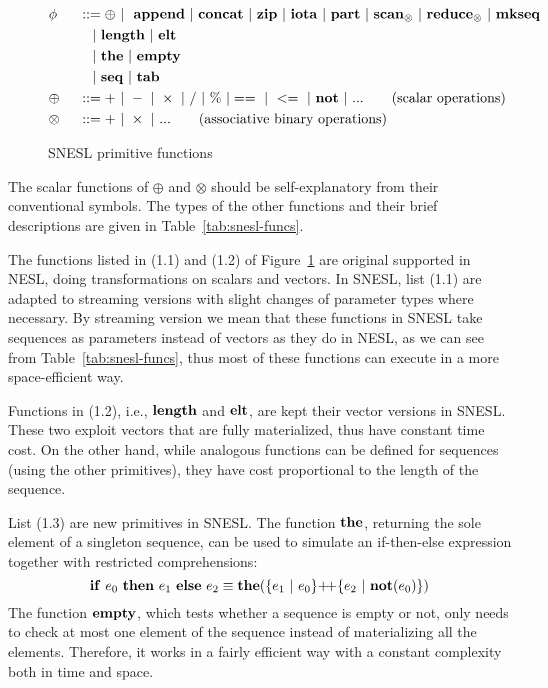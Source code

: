 \begin{figure}[H]\large
\begin{alignat}{2} 
&\phi && ::= \oplus \ | \ \ \mathbf{append} \ | \ \mathbf{concat} \ | \ \mathbf{zip} \ | \ \mathbf{iota}  \ | \ \mathbf{part}  \ | \ \mathbf{scan}_{\otimes} \ | \ \mathbf{reduce}_{\otimes} \ | \ \mathbf{mkseq} \\
&   && \quad | \ \mathbf{length} \ | \ \mathbf{elt} \\
&   && \quad | \ \mathbf{the}  \ | \ \mathbf{empty} \\
&   && \quad | \ \mathbf{seq} \ | \ \mathbf{tab} \\
& \oplus  \ && :: = + \ | \ - \ | \ \times \ |  \  / \ | \ \% \ | ==  \ |\ <=  \ | \ \mathbf{not} \ | \ ... \tag{scalar operations} \\
& \otimes \ && :: = + \ | \ \times  \ | \ ...  \tag{associative binary operations}
\end{alignat}
\caption{SNESL primitive functions \label{fig-snesl-func}}
\end{figure}

The scalar functions of $\oplus$ and $\otimes$ should be self-explanatory from their conventional symbols. 
The types of the other functions and their brief descriptions are given in Table~\ref{tab:snesl-funcs}.

The functions listed in (1.1) and (1.2) of Figure~\ref{fig-snesl-func} are original supported in NESL, doing transformations on scalars and vectors.
In SNESL, list (1.1) are adapted to streaming versions with slight changes of parameter types where necessary.
By streaming version we mean that these functions in SNESL take sequences as parameters instead of vectors as they do in NESL, as we can see from Table~\ref{tab:snesl-funcs}, thus most of these functions can execute in a more space-efficient way.  

Functions in (1.2), i.e., $\mathbf{length}$ and $\mathbf{elt}$, are kept their vector versions in SNESL. 
These two exploit vectors that are fully materialized, thus have constant time cost.
On the other hand, while analogous functions can be defined for sequences (using the other primitives), they have cost proportional to the length of the sequence.

List (1.3) are new primitives in SNESL.  
The function $\mathbf{the}$, returning the sole element of a singleton sequence, can be used to simulate an if-then-else expression together with restricted comprehensions:
$$\*{if} \ e_0 \ \*{then} \ e_1 \ \*{else} \ e_2 \equiv \*{the}(\{e_1 \ | \ e_0 \} {\++} \{e_2 \ | \ \*{not}(e_0)\}) $$
The function $\mathbf{empty}$, which tests whether a sequence is empty or not, only needs to check at most one element of the sequence instead of materializing all the elements. Therefore, it works in a fairly efficient way with a constant complexity both in time and space.

